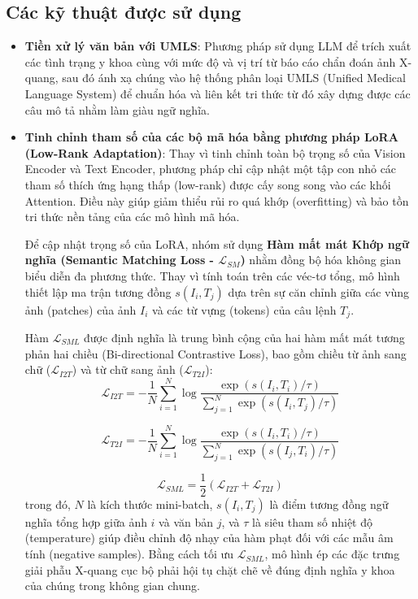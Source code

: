 \subsection{Các kỹ thuật được sử dụng}
\begin{itemize}
    \item \textbf{Tiền xử lý văn bản với UMLS}: Phương pháp sử dụng LLM để trích xuất các tình trạng y khoa cùng với mức độ và vị trí từ báo cáo chẩn đoán ảnh X-quang, sau đó ánh xạ chúng vào hệ thống phân loại UMLS (Unified Medical Language System) để chuẩn hóa và liên kết tri thức từ đó xây dựng được các câu mô tả nhằm làm giàu ngữ nghĩa.
    \item \textbf{Tinh chỉnh tham số của các bộ mã hóa bằng phương pháp LoRA (Low-Rank Adaptation)}: Thay vì tinh chỉnh toàn bộ trọng số của Vision Encoder và Text Encoder, phương pháp chỉ cập nhật một tập con nhỏ các tham số thích ứng hạng thấp (low-rank) được cấy song song vào các khối Attention. Điều này giúp giảm thiểu rủi ro quá khớp (overfitting) và bảo tồn tri thức nền tảng của các mô hình mã hóa.
    
    Để cập nhật trọng số của LoRA, nhóm sử dụng \textbf{Hàm mất mát Khớp ngữ nghĩa (Semantic Matching Loss - $\mathcal{L}_{SM}$)} nhằm đồng bộ hóa không gian biểu diễn đa phương thức. Thay vì tính toán trên các véc-tơ tổng, mô hình thiết lập ma trận tương đồng $s(I_i, T_j)$ dựa trên sự căn chỉnh giữa các vùng ảnh (patches) của ảnh $I_i$ và các từ vựng (tokens) của câu lệnh $T_j$. 

    Hàm $\mathcal{L}_{SML}$ được định nghĩa là trung bình cộng của hai hàm mất mát tương phản hai chiều (Bi-directional Contrastive Loss), bao gồm chiều từ ảnh sang chữ ($\mathcal{L}_{I2T}$) và từ chữ sang ảnh ($\mathcal{L}_{T2I}$):
    \begin{equation}
        \mathcal{L}_{I2T} = -\frac{1}{N} \sum_{i=1}^{N} \log \frac{\exp(s(I_i, T_i) / \tau)}{\sum_{j=1}^{N} \exp(s(I_i, T_j) / \tau)}
    \end{equation}

    \begin{equation}
        \mathcal{L}_{T2I} = -\frac{1}{N} \sum_{i=1}^{N} \log \frac{\exp(s(I_i, T_i) / \tau)}{\sum_{j=1}^{N} \exp(s(I_j, T_i) / \tau)}
    \end{equation}

    \begin{equation}
        \mathcal{L}_{SML} = \frac{1}{2} (\mathcal{L}_{I2T} + \mathcal{L}_{T2I})
    \end{equation}
    trong đó, $N$ là kích thước mini-batch, $s(I_i, T_j)$ là điểm tương đồng ngữ nghĩa tổng hợp giữa ảnh $i$ và văn bản $j$, và $\tau$ là siêu tham số nhiệt độ (temperature) giúp điều chỉnh độ nhạy của hàm phạt đối với các mẫu âm tính (negative samples). Bằng cách tối ưu $\mathcal{L}_{SML}$, mô hình ép các đặc trưng giải phẫu X-quang cục bộ phải hội tụ chặt chẽ về đúng định nghĩa y khoa của chúng trong không gian chung.


\end{itemize}
